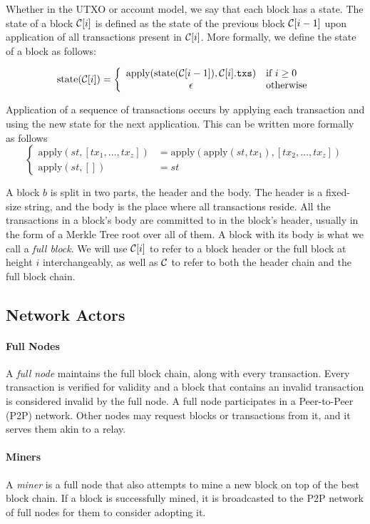 Whether in the UTXO or account model, we say that each block has a state. The state of a block $\mathcal{C}[i]$ is defined as the state of the previous block $\mathcal{C}[i-1]$ upon application of all transactions present in $\mathcal{C}[i]$. More formally, we define the state of a block as follows:

\[
\text{state}(\mathcal{C}[i]) = \left\{
    \begin{array}{cl}
        \text{apply}(\text{state}(\mathcal{C}[i-1]), \mathcal{C}[i].\texttt{txs}) & \text{if } i \ge 0 \\
        \epsilon & \text{otherwise}
    \end{array}
\right.
\]

Application of a sequence of transactions occurs by applying each transaction and using the new state for the next application. This can be written more formally as follows
\[
\left\{
    \begin{array}{rl}
        \text{apply}(st, [tx_1, \dots, tx_z]) &= \text{apply}(\text{apply}(st, tx_1), [tx_2, \dots, tx_z]) \\
        \text{apply}(st, []) &= st
    \end{array}
\right.
\]

A block $b$ is split in two parts, the header and the body. The header is a fixed-size string, and the body is the place where all transactions reside. All the transactions in a block's body are committed to in the block's header, usually in the form of a Merkle Tree root over all of them. A block with its body is what we call a \emph{full block}. We will use $\mathcal{C}[i]$ to refer to a block header or the full block at height $i$ interchangeably, as well as $\mathcal{C}$ to refer to both the header chain and the full block chain.

\subsection{Network Actors}
\paragraph{Full Nodes}
A \emph{full node} maintains the full block chain, along with every transaction. Every transaction is verified for validity and a block that contains an invalid transaction is considered invalid by the full node. A full node participates in a Peer-to-Peer (P2P) network. Other nodes may request blocks or transactions from it, and it serves them akin to a relay.
\paragraph{Miners}
A \emph{miner} is a full node that also attempts to mine a new block on top of the best block chain. If a block is successfully mined, it is broadcasted to the P2P network of full nodes for them to consider adopting it.

